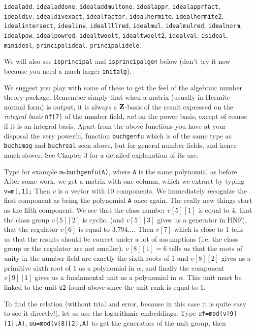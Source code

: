 {\tt idealadd}, {\tt idealaddone}, {\tt idealaddmultone}, {\tt idealappr},
{\tt idealapprfact}, {\tt idealdiv}, {\tt idealdivexact}, 
{\tt idealfactor}, {\tt idealhermite}, {\tt idealhermite2},
{\tt idealintersect}, {\tt idealinv}, {\tt ideallllred}, {\tt idealmul},
{\tt idealmulred}, {\tt idealnorm}, {\tt idealpow}, {\tt idealpowred},
{\tt idealtwoelt}, {\tt idealtwoelt2}, {\tt idealval}, {\tt isideal},
{\tt minideal}, {\tt principalideal}, {\tt principalidele}.

We will also see {\tt isprincipal} and {\tt isprincipalgen} below (don't try
it now because you need a much larger {\tt initalg}).

We suggest you play with some of these to get the feel of the algebraic
number theory package. Remember simply that when a matrix (usually in Hermite
normal form) is output, it is always a ${\bf Z}$-basis of the result expressed on
the {\it integral basis} {\tt nf[7]} of the number field, {\it not} on
the power basis, except of course if it is an integral basis.
\medskip
Apart from the above functions you have at your disposal the very powerful
function {\tt buchgenfu} which is of the same type as {\tt buchimag}
and {\tt buchreal} seen above, but for general number fields, and hence
much slower. See Chapter 3 for a detailed explanation of its use.

Type for example {\tt m=buchgenfu(A)}, where {\tt A} is the same 
polynomial as before. After some work, we get a matrix with one column, which
we extract by typing {\tt v=m[,1];} Then $v$ is a vector with 10 components.
We immediately recognize the first component as being the polynomial {\tt A}
once again. The really new things start as the fifth component. We see that the
class number $v[5][1]$ is equal to 4, that the class group $v[5][2]$ is cyclic,
(and $v[5][3]$ gives us a generator in HNF), that the regulator $v[6]$ is 
equal to $3.794\dots$. Then $v[7]$ which is close to 1 tells us that the 
results should be correct under a lot of assumptions (i.e. the class group or
the regulator are not smaller). $v[8][1]=6$ tells us that the roots of unity in
the number field are exactly the sixth roots of 1 and $v[8][2]$ gives us a 
primitive sixth root of 1 as a polynomial in $\alpha$, and finally the 
component $v[9][1]$ gives us a fundamental unit as a polynomial in $\alpha$.
This unit must be linked to the unit {\tt u2} found above since the unit
rank is equal to 1. 

To find the relation (without trial and error, because in this case it is
quite easy to see it directly!), let us use the logarithmic embeddings. Type
{\tt uf=mod(v[9][1],A)}, {\tt uu=mod(v[8][2],A)} to get the generators of the 
unit group, then 

